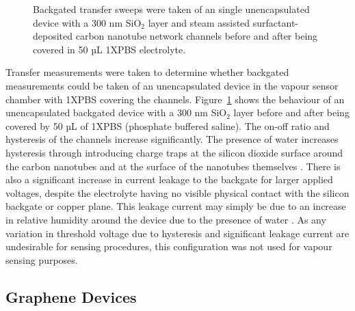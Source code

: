 \documentclass[
  a4paper,
]{scrbook}
\begin{document}
\begin{figure}
\begin{minipage}[t]{0.47\linewidth}
{{}

}

\subcaption{\label{fig-50uL-buffer}}
\end{minipage}%

\caption{\label{fig-buffer-effect-on-backgate}Backgated transfer sweeps
were taken of an single unencapsulated device with a 300 nm SiO\(_2\)
layer and steam assisted surfactant-deposited carbon nanotube network
channels before and after being covered in 50 µL 1XPBS electrolyte.}

\end{figure}

Transfer measurements were taken to determine whether backgated
measurements could be taken of an unencapsulated device in the vapour
sensor chamber with 1XPBS covering the channels.
Figure~\ref{fig-buffer-effect-on-backgate} shows the behaviour of an
unencapsulated backgated device with a 300 nm SiO\(_2\) layer before and
after being covered by 50 µL of 1XPBS (phosphate buffered saline). The
on-off ratio and hysteresis of the channels increase significantly. The
presence of water increases hysteresis through introducing charge traps
at the silicon dioxide surface around the carbon nanotubes and at the
surface of the nanotubes themselves
\autocite{Kim2003,Lee2007,Franklin2012,Ha2014}. There is also a
significant increase in current leakage to the backgate for larger
applied voltages, despite the electrolyte having no visible physical
contact with the silicon backgate or copper plane. This leakage current
may simply be due to an increase in relative humidity around the device
due to the presence of water \autocite{Conseil2014}. As any variation in
threshold voltage due to hysteresis and significant leakage current are
undesirable for sensing procedures, this configuration was not used for
vapour sensing purposes.

\hypertarget{graphene-devices}{%
\subsection{Graphene Devices}\label{graphene-devices}}
\end{document}

